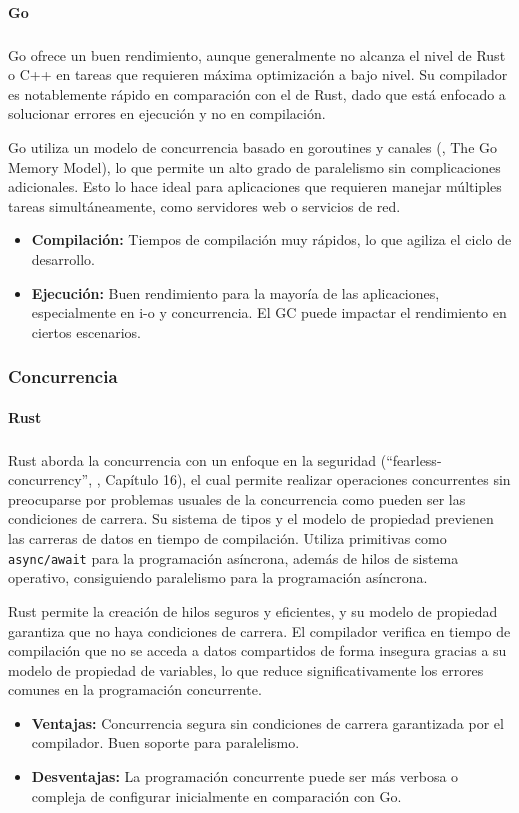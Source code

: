 \paragraph{Go}
\subparagraph{}

Go ofrece un buen rendimiento, aunque generalmente no alcanza el nivel de Rust o C++ en tareas que requieren máxima optimización a bajo nivel. Su compilador es notablemente rápido en comparación con el de Rust, dado que está enfocado a solucionar errores en ejecución y no en compilación.

Go utiliza un modelo de concurrencia basado en \glspl{goroutine} y canales (\cite{go-documentation}, The Go Memory Model), lo que permite un alto grado de paralelismo sin complicaciones adicionales. Esto lo hace ideal para aplicaciones que requieren manejar múltiples tareas simultáneamente, como servidores web o servicios de red.

\begin{itemize}
    \item \textbf{Compilación:} Tiempos de compilación muy rápidos, lo que agiliza el ciclo de desarrollo.
    \item \textbf{Ejecución:} Buen rendimiento para la mayoría de las aplicaciones, especialmente en \acrshort{i-o} y concurrencia. El GC puede impactar el rendimiento en ciertos escenarios.
\end{itemize}

\subsubsection{Concurrencia}
\paragraph{Rust}
\subparagraph{}

Rust aborda la concurrencia con un enfoque en la seguridad (``\gls{fearless-concurrency}'', \cite{rustbook2024}, Capítulo 16), el cual permite realizar operaciones concurrentes sin preocuparse por problemas usuales de la concurrencia como pueden ser las condiciones de carrera.
Su sistema de tipos y el modelo de propiedad previenen las carreras de datos en tiempo de compilación.
Utiliza primitivas como \texttt{async/await} para la programación asíncrona, además de hilos de sistema operativo, consiguiendo paralelismo para la programación asíncrona.

Rust permite la creación de hilos seguros y eficientes, y su modelo de propiedad garantiza que no haya condiciones de carrera. El compilador verifica en tiempo de compilación que no se acceda a datos compartidos de forma insegura gracias a su modelo de propiedad de variables, lo que reduce significativamente los errores comunes en la programación concurrente.
\begin{itemize}
    \item \textbf{Ventajas:} Concurrencia segura sin condiciones de carrera garantizada por el compilador. Buen soporte para paralelismo.
    \item \textbf{Desventajas:} La programación concurrente puede ser más verbosa o compleja de configurar inicialmente en comparación con Go.
\end{itemize}

